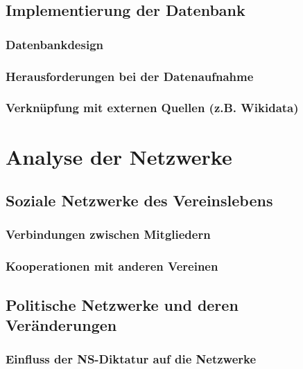 \documentclass[12pt, a4paper, ngerman, bidi=default]{article}
\begin{document}
\begin{description}
    \subsection{Implementierung der Datenbank}
      \subsubsection{Datenbankdesign}
      \subsubsection{Herausforderungen bei der Datenaufnahme}
      \subsubsection{Verknüpfung mit externen Quellen (z.B. Wikidata)}

    \newpage
\section{Analyse der Netzwerke}
  \subsection{Soziale Netzwerke des Vereinslebens}
    \subsubsection{Verbindungen zwischen Mitgliedern}
    \subsubsection{ Kooperationen mit anderen Vereinen}
\subsection{ Politische Netzwerke und deren Veränderungen}
    \subsubsection{Einfluss der NS-Diktatur auf die Netzwerke}

\end{description}
\end{document}
